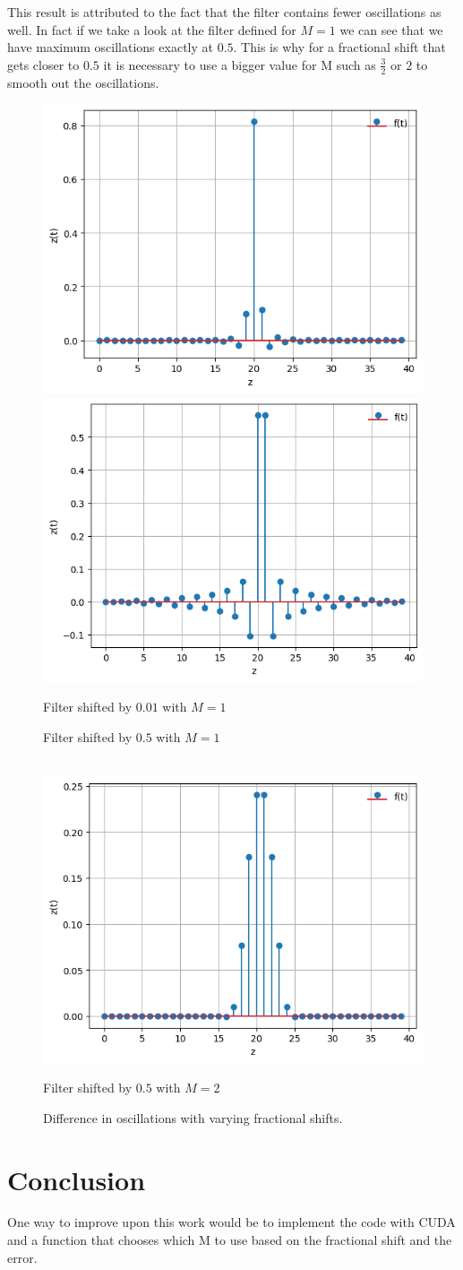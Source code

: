 \documentclass[]{usiinfbachelorproject}
\begin{document}
		This result is attributed to the fact that the filter contains fewer oscillations as well. In fact if we take a look at the filter defined for $M=1$ we can see that we have maximum oscillations exactly at $0.5$. 
		This is why for a fractional shift that gets closer to $0.5$ it is necessary to use a bigger value for M such as $\frac{3}{2}$ or $2$ to smooth out the oscillations.
		\begin{figure}[H]
			\centering
			\includegraphics[width=0.3\columnwidth]{images/Results/M_1_filter_small_shift.png}\hspace*{0.2\columnwidth}
			\includegraphics[width=0.3\columnwidth]{images/Results/M_1_filter_big_shift.png}\\
			\parbox{0.3\columnwidth}{\centering Filter shifted by $0.01$ with $M=1$}\hspace*{0.2\columnwidth}
			\parbox{0.3\columnwidth}{\centering Filter shifted by $0.5$ with $M=1$}\\
			\centering
			\includegraphics[width=0.3\columnwidth]{images/Results/M_2_filter_big_shift.png}\\
			\parbox{0.3\columnwidth}{\centering Filter shifted by $0.5$ with $M=2$}
			\caption{Difference in oscillations with varying fractional shifts.}
			\label{different_shifts_small_M}
		\end{figure}

		
		\section{Conclusion}
		One way to improve upon this work would be to implement the code with CUDA and a function that chooses which M to use based on the fractional shift and the error.
	
	
	
	
	
	
\end{document}
